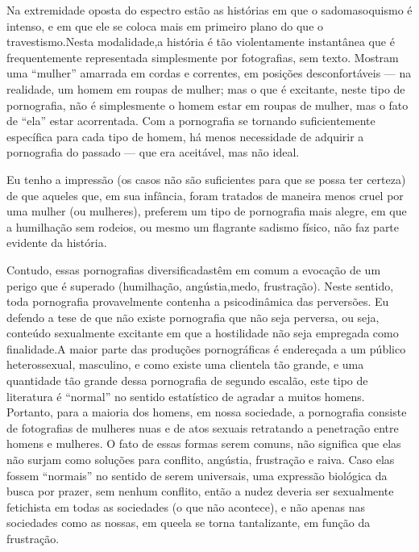 Na extremidade oposta do espectro estão as histórias em que o
sadomasoquismo\idxpornosadi{} é intenso,\idxsadiporn{} e em que ele se coloca mais em primeiro plano
do que o travestismo.\idxtrave[|)] Nesta modalidade,\idxtravemporn[|)] a história é tão violentamente
instantânea que é frequentemente representada simplesmente por
fotografias, sem texto. Mostram uma
``mulher'' amarrada em cordas e correntes, em
posições desconfortáveis --- na realidade, um homem em roupas de
mulher; mas o que é excitante, neste tipo de pornografia, não é
simplesmente o homem estar em roupas de mulher, mas o fato de
``ela'' estar acorrentada. Com a pornografia
se tornando suficientemente específica para cada tipo de homem, há
menos necessidade de adquirir a pornografia do passado --- que era
aceitável, mas não ideal.

Eu tenho a impressão (os casos não são suficientes para que se possa
ter certeza) de que aqueles que, em sua infância, foram tratados de
maneira menos cruel por uma mulher (ou mulheres), preferem um tipo de
pornografia mais alegre, em que a humilhação sem rodeios, ou mesmo um
flagrante sadismo físico, não faz parte evidente da história.

Contudo, essas pornografias diversificadas\idxpornoangu[|(] têm em comum a evocação
de um perigo que é superado (humilhação, angústia,\idxanguporn[|(] medo, frustração).
Neste sentido, toda pornografia provavelmente contenha a psicodinâmica
das perversões. Eu defendo a tese de que não existe pornografia que não
seja perversa, ou seja, conteúdo sexualmente excitante em que a
hostilidade\idxhostporn{} não\idxpornohost{} seja empregada como finalidade.\idxpornohete[|(] A maior parte das
produções pornográficas é endereçada a um público heterossexual,
masculino, e como existe uma clientela tão grande, e uma quantidade tão
grande dessa pornografia de segundo escalão, este tipo de literatura é
``normal'' no sentido estatístico de agradar
a muitos homens. Portanto, para a maioria dos homens, em nossa
sociedade, a pornografia consiste de fotografias de mulheres nuas e de
atos sexuais retratando a penetração entre homens e mulheres. O fato de
essas formas serem comuns, não significa que elas não surjam como
soluções para conflito, angústia, frustração e raiva. Caso elas fossem
``normais'' no sentido de serem universais,
uma expressão biológica da busca por prazer, sem nenhum conflito, então
a nudez\idxfeticnude{} deveria ser sexualmente fetichista em todas as sociedades (o
que não acontece), e não apenas nas sociedades como as nossas, em que\idxpornoplat[|)]
ela se torna tantalizante, em função da frustração.

